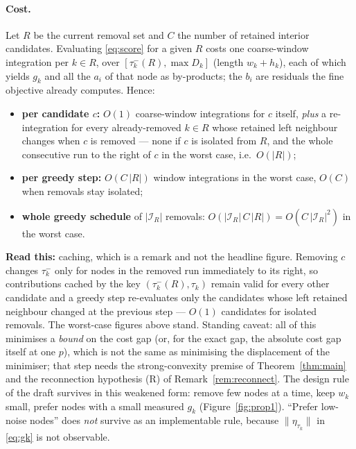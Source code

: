 \documentclass[11pt]{article}
\theoremstyle{remark}\newtheorem{remark}{Remark}
\newcommand{\norm}[1]{\lVert #1\rVert}
\newcommand{\readthis}[1]{\textbf{Read this:} #1}
\begin{document}
\paragraph{Cost.} Let $R$ be the current removal set and $C$ the number of retained interior candidates. Evaluating \eqref{eq:score} for a given $R$ costs one coarse-window integration per $k\in R$, over $[\tau_k^{-}(R),\max D_k]$ (length $w_k+h_k$), each of which yields $g_k$ and all the $a_i$ of that node as by-products; the $b_i$ are residuals the fine objective already computes. Hence:
\begin{itemize}[nosep]
\item \textbf{per candidate $c$:} $O(1)$ coarse-window integrations for $c$ itself, \emph{plus} a re-integration for every already-removed $k\in R$ whose retained left neighbour changes when $c$ is removed --- none if $c$ is isolated from $R$, and the whole consecutive run to the right of $c$ in the worst case, i.e.\ $O(|R|)$;
\item \textbf{per greedy step:} $O(C\,|R|)$ window integrations in the worst case, $O(C)$ when removals stay isolated;
\item \textbf{whole greedy schedule} of $|\mathcal I_R|$ removals: $O(|\mathcal I_R|\,C\,|R|)=O(C\,|\mathcal I_R|^{2})$ in the worst case.
\end{itemize}
\readthis{caching, which is a remark and not the headline figure. Removing $c$ changes $\tau_k^{-}$ only for nodes in the removed run immediately to its right, so contributions cached by the key $(\tau_k^{-}(R),\tau_k)$ remain valid for every other candidate and a greedy step re-evaluates only the candidates whose left retained neighbour changed at the previous step --- $O(1)$ candidates for isolated removals. The worst-case figures above stand. Standing caveat: all of this minimises a \emph{bound} on the cost gap (or, for the exact gap, the absolute cost gap itself at one $p$), which is not the same as minimising the displacement of the minimiser; that step needs the strong-convexity premise of Theorem~\ref{thm:main} and the reconnection hypothesis (R) of Remark~\ref{rem:reconnect}. The design rule of the draft survives in this weakened form: remove few nodes at a time, keep $w_k$ small, prefer nodes with a small measured $g_k$ (Figure~\ref{fig:prop1}). ``Prefer low-noise nodes'' does \emph{not} survive as an implementable rule, because $\norm{\eta_{\tau_k}}$ in \eqref{eq:gk} is not observable.}
\end{document}
